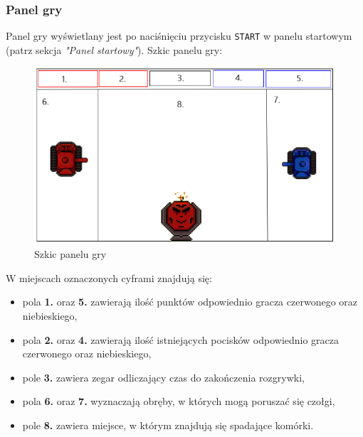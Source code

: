 \documentclass[a4paper]{article}
\begin{document}
\subsubsection{Panel gry}
\quad Panel gry wy\'swietlany jest po naci\'sni\k{e}ciu przycisku \texttt{START} w panelu startowym (patrz sekcja \textit{"Panel startowy"}). 
Szkic panelu gry:
\begin{figure}[ht]
    \centering
    \includegraphics[scale=0.4]{exampleGamePanel.png}
    \color{lightgray}\caption{Szkic panelu gry}
    \label{fig:gamePanel}
\end{figure}


W miejscach oznaczonych cyframi znajduj\k{a} si\k{e}:
\begin{itemize}
    \item pola \textbf{1.} oraz \textbf{5.} zawieraj\k{a} ilo\'s\'c punkt\'ow odpowiednio gracza czerwonego oraz niebieskiego, 
    \item pola \textbf{2.} oraz \textbf{4.} zawieraj\k{a} ilo\'s\'c istniej\k{a}cych pocisk\'ow odpowiednio gracza czerwonego oraz niebieskiego, 
    \item pole \textbf{3.} zawiera zegar odliczaj\k{a}cy czas do zako\'nczenia rozgrywki,
    \item pola \textbf{6.} oraz \textbf{7.} wyznaczaj\k{a} obr\k{e}by, w kt\'orych mog\k{a} porusza\'c si\k{e} czo\l{}gi,
    \item pole \textbf{8.} zawiera miejsce, w kt\'orym znajduj\k{a} si\k{e} spadaj\k{a}ce kom\'orki.
\end{itemize}
\end{document}
